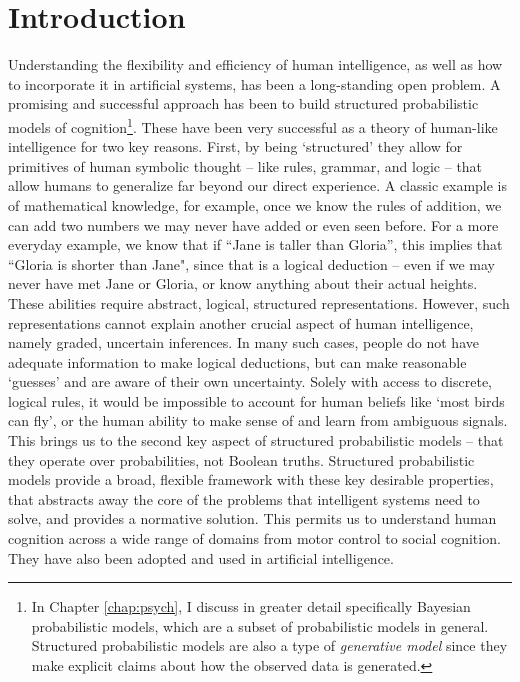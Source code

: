\chapter{Introduction}
\label{chap:intro}

Understanding the flexibility and efficiency of human intelligence, as well as how to incorporate it in artificial systems, has been a long-standing open problem. A promising and successful approach has been to build structured probabilistic models of cognition\footnote{In Chapter \ref{chap:psych}, I discuss in greater detail specifically Bayesian probabilistic models, which are a subset of probabilistic models in general. Structured probabilistic models are also a type of \textit{generative model} since they make explicit claims about how the observed data is generated.}. These have been very successful as a theory of human-like intelligence for two key reasons. First, by being `structured' they allow for primitives of human symbolic thought -- like rules, grammar, and logic -- that allow humans to generalize far beyond our direct experience. \cite{fodor88, chomsky2002syntactic} A classic example is of mathematical knowledge, for example, once we know the rules of addition, we can add two numbers we may never have added or even seen before. For a more everyday example, we know that if ``Jane is taller than Gloria'', this implies that ``Gloria is shorter than Jane", since that is a logical deduction -- even if we may never have met Jane or Gloria, or know anything about their actual heights. These abilities require abstract, logical, structured representations. However, such representations cannot explain another crucial aspect of human intelligence, namely graded, uncertain inferences.\cite{rogers2004semantic} In many such cases, people do not have adequate information to make logical deductions, but can make reasonable `guesses' and are aware of their own uncertainty. Solely with access to discrete, logical rules, it would be impossible to account for human beliefs like `most birds can fly', or the human ability to make sense of and learn from ambiguous signals. This brings us to the second key aspect of structured probabilistic models -- that they operate over probabilities, not Boolean truths. Structured probabilistic models provide a broad, flexible framework with these key desirable properties, that abstracts away the core of the problems that intelligent systems need to solve, and provides a normative solution. This permits us to understand human cognition across a wide range of domains\citep{griffiths2008bayesian} from motor control\citep{kording2006bayesian} to social cognition\citep{baker2007goal}. They have also been adopted and used in artificial intelligence\citep{lake2015human, del2013understanding, zhao2011image, steyvers2007probabilistic}.

